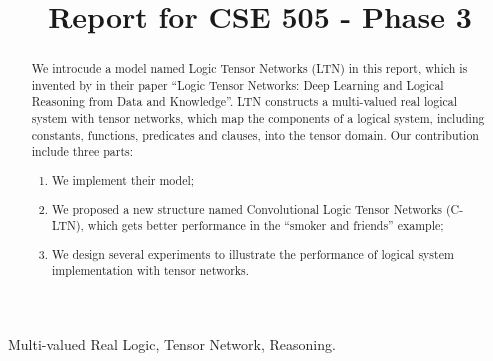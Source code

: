 \documentclass[conference]{IEEEtran}
\begin{document}
%
\title{Report for CSE 505 - Phase 3}


\author{
}

\maketitle


\begin{abstract}
We introcude a model named Logic Tensor Networks (LTN) in this report, which is invented by \cite{serafini2016logic} in their paper ``Logic Tensor Networks: Deep Learning and Logical Reasoning from Data and Knowledge''.
LTN constructs a multi-valued real logical system \cite{bergmann2008introduction} with tensor networks, which map the components of a logical system, including constants, functions, predicates and clauses, into  the tensor domain.
Our contribution include three parts:
\begin{enumerate}
    \item We implement their model;
    \item We proposed a new structure named Convolutional Logic Tensor Networks (C-LTN), which gets better performance in the ``smoker and friends'' example;
    \item We design several experiments to illustrate the performance of logical system implementation with tensor networks.
\end{enumerate}
\end{abstract}

\begin{IEEEkeywords}
Multi-valued Real Logic, Tensor Network, Reasoning.
\end{IEEEkeywords}


















\end{document}
